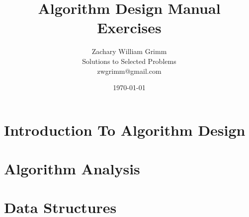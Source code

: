 \documentclass[10pt,letterpaper]{article}
\title{Algorithm Design Manual Exercises}
\author{Zachary William Grimm\\
  \small{Solutions to Selected Problems}\\
  \small{zwgrimm@gmail.com}
}
\date{\today{}}
\begin{document}
\maketitle

\tableofcontents{}

\newpage{}


\section{Introduction To Algorithm Design}




\section{Algorithm Analysis}


\section{Data Structures}











% 
\end{document}
